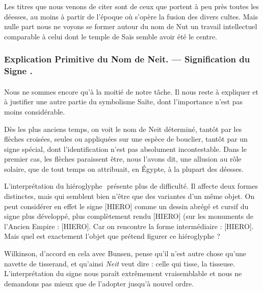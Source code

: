 \documentclass[a4paper, 11pt, oneside]{article}
\newcommand*\hieroglyhicsAAAO{}
\begin{document}
Les titres que nous venons de citer sont de ceux que portent à peu près toutes les déesses, au moins à partir de l'époque où s'opère la fusion des divers cultes. Mais nulle part nous ne voyons se former autour du nom de Nut un travail intellectuel comparable à celui dont le temple de Saïs semble avoir été le centre.

\subsubsection{Explication Primitive du Nom de Neit. --- Signification du Signe $\hieroglyhicsAAAO$.}
\paragraph{}
Nous ne sommes encore qu'à la moitié de notre tâche. Il nous reste à expliquer et à justifier une autre partie du symbolisme Saïte, dont l'importance n'est pas moins considérable.

Dès les plus anciens temps, on voit le nom de Neit déterminé, tantôt par les flèches croisées, seules ou appliquées sur une espèce de bouclier, tantôt par un signe spécial, dont l'identification n'est pas absolument incontestable. Dans le premier cas, les flèches paraissent être, nous l'avons dit, une allusion au rôle solaire, que de tout temps on attribuait, en Égypte, à la plupart des déesses.

L'interprétation du hiéroglyphe $\hieroglyhicsAAAO$ présente plus de difficulté. Il affecte deux formes distinctes, mais qui semblent bien n'être que des variantes d'un même objet. On peut considérer en effet le signe [HIERO] comme un dessin abrégé et cursif du signe plus développé, plus complètement rendu [HIERO] (sur les monuments de l'Ancien Empire : [HIERO]. Car on rencontre la forme intermédiaire : [HIERO]. Mais quel est exactement l'objet que prétend figurer ce hiéroglyphe ?

Wilkinson, d'accord en cela avec Bunsen, pense qu'il n'est autre chose qu'une navette de tisserand, et qu'ainsi \emph{Neit} veut dire : celle qui tisse, la tisseuse. L'interprétation du signe nous paraît extrêmement vraisemblable et nous ne demandons pas mieux que de l'adopter jusqu'à nouvel ordre.
\end{document}
